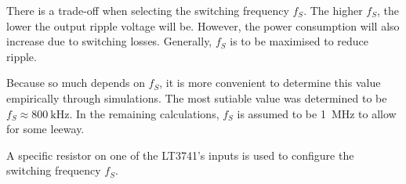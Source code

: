 There is a trade-off when  selecting the switching frequency $f_S$. The higher
$f_S$,  the  lower the  output  ripple  voltage  will be. However,  the  power
consumption will also  increase due to switching losses.   Generally, $f_S$ is
to be maximised to reduce ripple.

Because so  much depends  on $f_S$,  it is more  convenient to  determine this
value empirically through simulations. The  most sutiable value was determined
to be $f_S \approx\SI{800}{\kilo\hertz}$. In the remaining calculations, $f_S$
is assumed to be \SI{1}{\mega\hertz} to allow for some leeway.

A specific  resistor on one  of the LT3741's inputs  is used to  configure the
switching frequency $f_S$.
